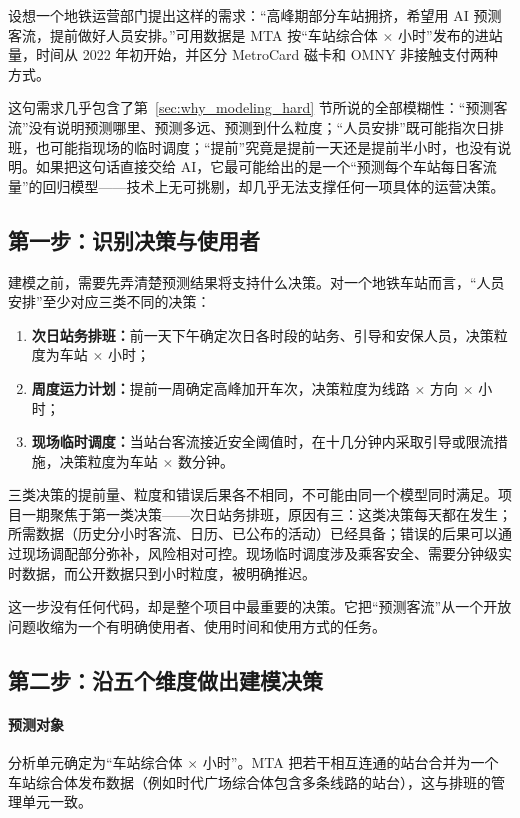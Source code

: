 设想一个地铁运营部门提出这样的需求：“高峰期部分车站拥挤，希望用 AI 预测客流，提前做好人员安排。”可用数据是 MTA 按“车站综合体 $\times$ 小时”发布的进站量，时间从 2022 年初开始，并区分 MetroCard 磁卡和 OMNY 非接触支付两种方式。

这句需求几乎包含了第~\ref{sec:why_modeling_hard} 节所说的全部模糊性：“预测客流”没有说明预测哪里、预测多远、预测到什么粒度；“人员安排”既可能指次日排班，也可能指现场的临时调度；“提前”究竟是提前一天还是提前半小时，也没有说明。如果把这句话直接交给 AI，它最可能给出的是一个“预测每个车站每日客流量”的回归模型——技术上无可挑剔，却几乎无法支撑任何一项具体的运营决策。

\subsection{第一步：识别决策与使用者}

建模之前，需要先弄清楚预测结果将支持什么决策。对一个地铁车站而言，“人员安排”至少对应三类不同的决策：

\begin{enumerate}
  \item \textbf{次日站务排班：}前一天下午确定次日各时段的站务、引导和安保人员，决策粒度为车站 $\times$ 小时；
  \item \textbf{周度运力计划：}提前一周确定高峰加开车次，决策粒度为线路 $\times$ 方向 $\times$ 小时；
  \item \textbf{现场临时调度：}当站台客流接近安全阈值时，在十几分钟内采取引导或限流措施，决策粒度为车站 $\times$ 数分钟。
\end{enumerate}

三类决策的提前量、粒度和错误后果各不相同，不可能由同一个模型同时满足。项目一期聚焦于第一类决策——次日站务排班，原因有三：这类决策每天都在发生；所需数据（历史分小时客流、日历、已公布的活动）已经具备；错误的后果可以通过现场调配部分弥补，风险相对可控。现场临时调度涉及乘客安全、需要分钟级实时数据，而公开数据只到小时粒度，被明确推迟。

这一步没有任何代码，却是整个项目中最重要的决策。它把“预测客流”从一个开放问题收缩为一个有明确使用者、使用时间和使用方式的任务。

\subsection{第二步：沿五个维度做出建模决策}

\paragraph{预测对象} 分析单元确定为“车站综合体 $\times$ 小时”。MTA 把若干相互连通的站台合并为一个车站综合体发布数据（例如时代广场综合体包含多条线路的站台），这与排班的管理单元一致。

